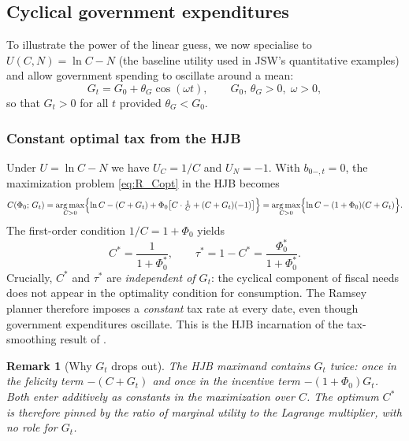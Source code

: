 \documentclass[12pt]{article}
\DeclareMathOperator*{\argmax}{arg\,max}
\newtheorem{remark}{Remark}
\begin{document}
\subsection{Cyclical government expenditures}
\label{sub:cyclical_ramsey}

To illustrate the power of the linear guess, we now specialise to
$U(C,N)=\ln C - N$ (the baseline utility used in JSW's quantitative
examples) and allow government spending to oscillate around a mean:
\begin{equation}\label{eq:cyc_G}
  G_t = G_0 + \theta_G \cos(\omega t), \qquad G_0,\,\theta_G>0,\;\omega>0,
\end{equation}
so that $G_t > 0$ for all $t$ provided $\theta_G < G_0$.

\subsubsection{Constant optimal tax from the HJB}

Under $U = \ln C - N$ we have $U_C = 1/C$ and $U_N = -1$.  With
$b_{0-,t}=0$, the maximization problem \eqref{eq:R_Copt} in the HJB becomes
\begin{equation}\label{eq:cyc_HJBmax}
  C(\Phi_0;\, G_t)
  = \argmax_{C>0}\Bigl\{
  \ln C - (C+G_t)
  + \Phi_0\bigl[C\cdot\tfrac{1}{C} + (C+G_t)(-1)\bigr]
  \Bigr\}
  = \argmax_{C>0}\Bigl\{
  \ln C - (1+\Phi_0)(C+G_t)
  \Bigr\}.
\end{equation}
The first-order condition $1/C = 1+\Phi_0$ yields
\begin{equation}\label{eq:cyc_Cstar}
  C^* = \frac{1}{1+\Phi_0^*},
  \qquad
  \tau^* = 1 - C^* = \frac{\Phi_0^*}{1+\Phi_0^*}.
\end{equation}
Crucially, $C^*$ and $\tau^*$ are \emph{independent of $G_t$}: the cyclical
component of fiscal needs does not appear in the optimality condition for
consumption.  The Ramsey planner therefore imposes a \emph{constant} tax
rate at every date, even though government expenditures oscillate.  This is
the HJB incarnation of the tax-smoothing result of \citet{barro1979determination}.

\medskip
\begin{remark}[Why $G_t$ drops out]
The HJB maximand contains $G_t$ twice: once in the felicity term $-(C+G_t)$
and once in the incentive term $-(1+\Phi_0)G_t$.  Both enter additively as
constants in the maximization over $C$.  The optimum $C^*$ is therefore
pinned by the ratio of marginal utility to the Lagrange multiplier, with no
role for $G_t$.
\end{remark}
\end{document}
